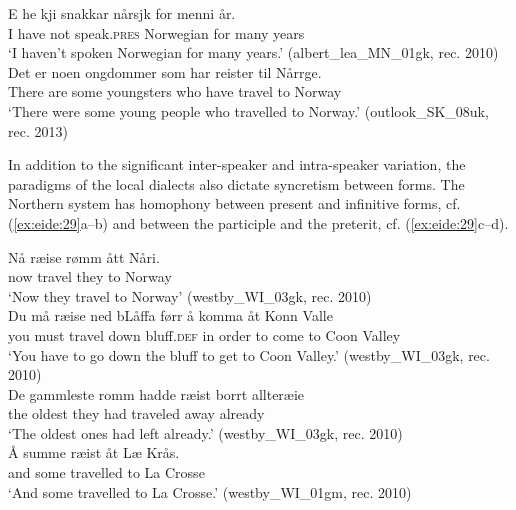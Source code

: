 \documentclass[output=paper]{langscibook}
\begin{document}
\ea%
    \label{ex:eide:28}
    \ea \label{ex:eide:28a}  
    \gll E he kji snakkar nårsjk for menni år.        \\
         I have not speak.\textsc{pres} Norwegian for many years    \\
    \glt ‘I haven’t spoken Norwegian for many years.’ (albert\_lea\_MN\_01gk, rec. 2010)\\
    \ex \label{ex:eide:28b} 
    \gll Det er noen ongdommer som har reister til Nårrge.    \\
         There are some youngsters who have travel to Norway    \\
    \glt ‘There were some young people who travelled to Norway.’ (outlook\_SK\_08uk, rec. 2013)\\  
    \z %
\z

\begin{sloppypar}
In addition to the significant inter-speaker and intra-speaker variation, the paradigms of the local dialects also dictate syncretism between forms. The Northern system has homophony between present and infinitive forms, cf. (\ref{ex:eide:29}a--b) and between the participle and the preterit, cf. (\ref{ex:eide:29}c--d).  
\end{sloppypar}

\ea%
    \label{ex:eide:29}
    \ea  
    \gll Nå ræise rømm ått Nåri.\\
         now travel they to Norway          \\
    \glt ‘Now they travel to Norway’ ({{westby\_WI\_03gk}}, rec. 2010)\\
    \ex  
    \gll Du må ræise ned bLåffa førr å komma åt Konn Valle     \\
         you must travel down bluff.\textsc{def} {in order} to come to Coon Valley   \\
    \glt ‘You have to go down the bluff to get to Coon Valley.’ ({{westby\_WI\_03gk}}, rec. 2010)\\
    \ex  
    \gll De gammleste romm hadde ræist borrt allteræie       \\
         the oldest they had traveled away already      \\
    \glt ‘The oldest ones had left already.’ ({{westby\_WI\_03gk}}, rec. 2010)\\
    \ex  
    \gll Å summe ræist åt Læ Krås.                \\
         and some travelled to La Crosse\\
    \glt ‘And some travelled to La Crosse.’ ({{westby\_WI\_01gm}}, rec. 2010)\\
    \z %
\z
        
\end{document}
